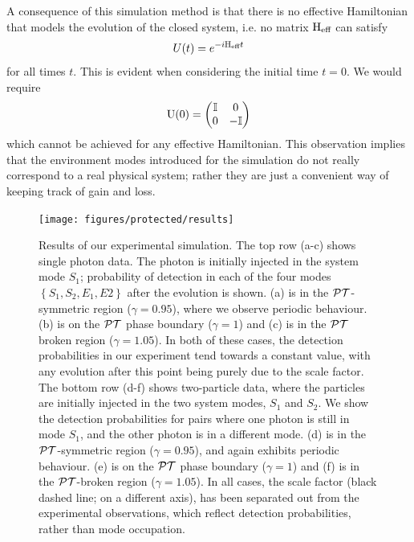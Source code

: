 A consequence of this simulation method is that there is no effective
Hamiltonian that models the evolution of the closed system, i.e. no matrix
\(\mathrm{H}_{\text{eff}}\) can satisfy
\begin{equation}
  U\!\left(t\right) = e^{-i\mathrm{H}_{\text{eff}}t}
\end{equation}
for all times \(t\). This is evident when considering the initial time \(t=0\).
We would require
\begin{equation}
  \mathrm{U}\!\left(0\right) = \begin{pmatrix}
    \mathbb{I} & 0 \\
    0 & -\mathbb{I}
  \end{pmatrix}
\end{equation}
which cannot be achieved for any effective Hamiltonian. This observation implies
that the environment modes introduced for the simulation do not really
correspond to a real physical system; rather they are just a convenient way of
keeping track of gain and loss.

\begin{figure}[t]
  \centering
  \texttt{[image: figures/protected/results]}
  \caption[Results of simulation]
    {Results of our experimental simulation. The top row (a-c) shows
    single photon data. The photon is initially injected in the system mode
    \(S_1\); probability of detection in each of the four modes \(\left\{S_1,
    S_2, E_1, E2\right\}\) after the evolution is shown. (a) is in the
    \(\mathcal{PT}\)-symmetric region (\(\gamma=0.95\)), where we observe periodic
    behaviour. (b) is on the \(\mathcal{PT}\) phase boundary (\(\gamma=1\)) and (c) is
    in the \(\mathcal{PT}\) broken region (\(\gamma=1.05\)). In both of these cases,
    the detection probabilities in our
    experiment tend towards a constant value, with any evolution after this
    point being purely due to the scale factor. The bottom row (d-f) shows
    two-particle data, where the particles are initially injected in the two
    system modes, \(S_1\) and \(S_2\). We show the detection probabilities for
    pairs where one photon is still in mode \(S_1\), and the other photon is in
    a different mode. (d) is in the \(\mathcal{PT}\)-symmetric region (\(\gamma=0.95\)),
    and again exhibits periodic behaviour. (e) is on the \(\mathcal{PT}\) phase boundary
    (\(\gamma=1\)) and (f) is in the \(\mathcal{PT}\)-broken region (\(\gamma=1.05\)). In
    all cases, the scale factor (black dashed line; on a different axis), has
    been separated out from the experimental observations, which reflect
    detection probabilities, rather than mode occupation.}
  \label{fig:results}
\end{figure}

